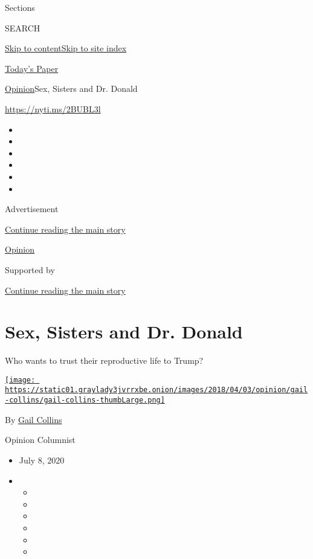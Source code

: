 Sections

SEARCH

\protect\hyperlink{site-content}{Skip to
content}\protect\hyperlink{site-index}{Skip to site index}

\href{https://myaccount.nytimes3xbfgragh.onion/auth/login?response_type=cookie\&client_id=vi}{}

\href{https://www.nytimes3xbfgragh.onion/section/todayspaper}{Today's
Paper}

\href{/section/opinion}{Opinion}\textbar{}Sex, Sisters and Dr. Donald

\url{https://nyti.ms/2BUBL3l}

\begin{itemize}
\item
\item
\item
\item
\item
\item
\end{itemize}

Advertisement

\protect\hyperlink{after-top}{Continue reading the main story}

\href{/section/opinion}{Opinion}

Supported by

\protect\hyperlink{after-sponsor}{Continue reading the main story}

\hypertarget{sex-sisters-and-dr-donald}{%
\section{Sex, Sisters and Dr. Donald}\label{sex-sisters-and-dr-donald}}

Who wants to trust their reproductive life to Trump?

\href{https://www.nytimes3xbfgragh.onion/by/gail-collins}{\texttt{[image: https://static01.graylady3jvrrxbe.onion/images/2018/04/03/opinion/gail-collins/gail-collins-thumbLarge.png]}}

By \href{https://www.nytimes3xbfgragh.onion/by/gail-collins}{Gail
Collins}

Opinion Columnist

\begin{itemize}
\item
  July 8, 2020
\item
  \begin{itemize}
  \item
  \item
  \item
  \item
  \item
  \item
  \end{itemize}
\end{itemize}

